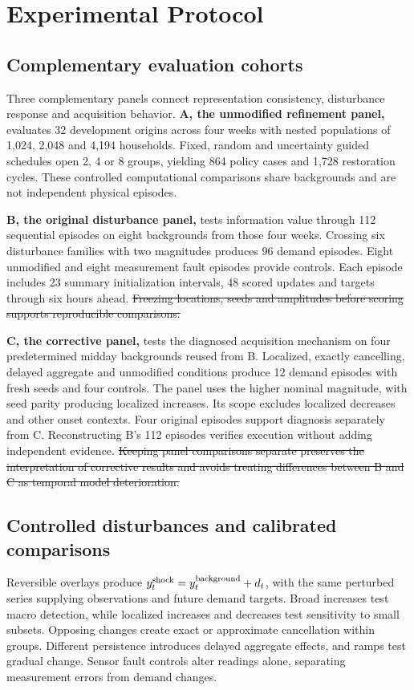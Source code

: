 \documentclass[conference]{IEEEtran}
\providecommand{\DIFdeltex}[1]{{\protect\color{red}\sout{#1}}}                      %
\providecommand{\DIFdelbegin}{} %
\providecommand{\DIFdelend}{} %
\providecommand{\DIFdel}[1]{\texorpdfstring{\DIFdeltex{#1}}{}} %
\begin{document}
\section{Experimental Protocol}
\subsection{Complementary evaluation cohorts}
Three complementary panels connect representation consistency, disturbance response and acquisition behavior. \textbf{A, the unmodified refinement panel,} evaluates 32 development origins across four weeks with nested populations of 1,024, 2,048 and 4,194 households. Fixed, random and uncertainty guided schedules open 2, 4 or 8 groups, yielding 864 policy cases and 1,728 restoration cycles. These controlled computational comparisons share backgrounds and are not independent physical episodes.

\textbf{B, the original disturbance panel,} tests information value through 112 sequential episodes on eight backgrounds from those four weeks. Crossing six disturbance families with two magnitudes produces 96 demand episodes. Eight unmodified and eight measurement fault episodes provide controls. Each episode includes 23 summary initialization intervals, 48 scored updates and targets through six hours ahead.
\DIFdelbegin \DIFdel{Freezing locations, seeds and amplitudes before scoring supports reproducible comparisons.
}\DIFdelend 

\textbf{C, the corrective panel,} tests the diagnosed acquisition mechanism on four predetermined midday backgrounds reused from B. Localized, exactly cancelling, delayed aggregate and unmodified conditions produce 12 demand episodes with fresh seeds and four controls. The panel uses the higher nominal magnitude, with seed parity producing localized increases. Its scope excludes localized decreases and other onset contexts. Four original episodes support diagnosis separately from C. Reconstructing B's 112 episodes verifies execution without adding independent evidence.
\DIFdelbegin \DIFdel{Keeping panel comparisons separate preserves the interpretation of corrective results and avoids treating differences between B and C as temporal model deterioration.
}\DIFdelend 




\subsection{Controlled disturbances and calibrated comparisons}
Reversible overlays produce $y^{\rm shock}_t=y^{\rm background}_t+d_t$, with the same perturbed series supplying observations and future demand targets. Broad increases test macro detection, while localized increases and decreases test sensitivity to small subsets. Opposing changes create exact or approximate cancellation within groups. Different persistence introduces delayed aggregate effects, and ramps test gradual change. Sensor fault controls alter readings alone, separating measurement errors from demand changes.
\end{document}
